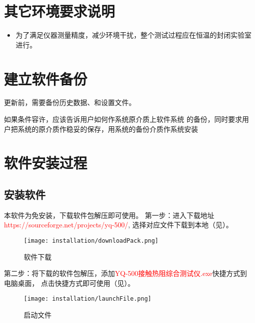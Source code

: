 \section{其它环境要求说明}
\begin{itemize}
    \item 为了满足仪器测量精度，减少环境干扰，整个测试过程应在恒温的封闭实验室进行。
\end{itemize}

\section{建立软件备份}
更新前，需要备份历史数据、和设置文件。

如果条件容许，应该告诉用户如何作系统原介质上软件系统
的备份，同时要求用户把系统的原介质作稳妥的保存，用系统的备份介质作系统安装
\section{软件安装过程}
\subsection{安装软件\label{subsec:install}}
本软件为免安装，下载软件包解压即可使用。
第一步：进入下载地址\textcolor{red}{https://sourceforge.net/projects/yq-500/},
选择对应文件下载到本地（见）。
\begin{figure}[htbp]
    \centering
    \texttt{[image: installation/downloadPack.png]}
    \caption{ 软件下载 \label{fig:downloadPack}}
\end{figure}
第二步：将下载的软件包解压，添加\textcolor{red}{YQ-500接触热阻综合测试仪.exe}快捷方式到电脑桌面，
点击快捷方式即可使用（见）。
\begin{figure}[htbp]
    \centering
    \texttt{[image: installation/launchFile.png]}
    \caption{ 启动文件 \label{fig:launchFile}}
\end{figure}
